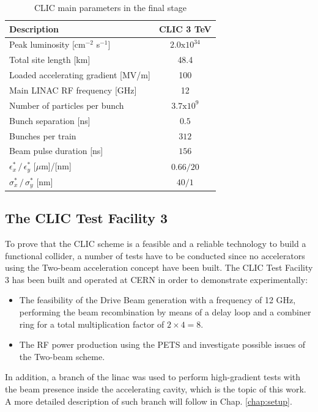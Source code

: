 \begin{table}[h]
  \centering
    \begin{tabular}{ l c  }
    \hline
    \hline
    \textbf{Description}						& \textbf{CLIC 3 TeV}	\\
    \hline
    Peak luminosity [cm$^{-2}$ s$^{-1}$]			& $2.0\text{x}10^{34}$	\\
    Total site length [km]						& 48.4				\\
    Loaded accelerating gradient [MV/m]			& 100	\\
    Main LINAC RF frequency	[GHz]			& 12	\\
    Number of particles per bunch				& $3.7\text{x}10^{9}$ \\
    Bunch separation [ns]						& $0.5$ \\
    Bunches per train							& $312$ \\
    Beam pulse duration [ns]					& $156$ \\
    $\epsilon^*_x \, / \, \epsilon^*_y$ [$\mu$m]/[nm]	& $0.66/20$ \\  
    $\sigma^*_x\, / \, \sigma^*_y$ [nm]			& $40/1$	\\
    
    \hline
    \hline
    \end{tabular}
  \caption{CLIC main parameters in the final stage}
\label{table_CLIC_params}
\end{table}







\subsection[CTF3]{The CLIC Test Facility 3}

To prove that the CLIC scheme is a feasible and a reliable technology to build a functional collider, a number of tests have to be conducted since no accelerators using the Two-beam acceleration concept have been built. The CLIC Test Facility 3 has been built and operated at CERN in order to demonstrate experimentally:

\begin{itemize}
\item The feasibility of the Drive Beam generation with a frequency of 12 GHz, performing the beam recombination by means of  a delay loop and a combiner ring for a total multiplication factor of $2\times4 =8$.
\item The RF power production using the PETS and investigate possible issues of the Two-beam scheme.
\end{itemize}
In addition, a branch of the linac was used to perform high-gradient tests with the beam presence inside the accelerating cavity, which is the topic of this work. A more detailed description of such branch will follow in Chap. \ref{chap:setup}.
